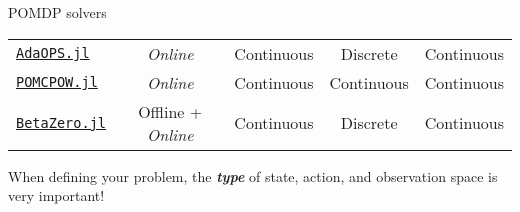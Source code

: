 \begin{frame}{POMDP solvers}
\begin{table}[!t]
{\begin{threeparttable}
\begin{tabular}{lcccc}
        \href{https://github.com/LAMDA-POMDP/AdaOPS.jl}{\texttt{AdaOPS.jl}} & \textit{Online} & Continuous & Discrete & Continuous \\
        \href{https://github.com/JuliaPOMDP/POMCPOW.jl}{\texttt{POMCPOW.jl}} & \textit{Online} & Continuous & Continuous & Continuous \\
        \href{https://github.com/sisl/BetaZero.jl}{\texttt{BetaZero.jl}} & Offline + \textit{Online} & Continuous & Discrete & Continuous \\
        \bottomrule
    \end{tabular}
    \end{threeparttable}
    }
\end{table}

{\footnotesize
\begin{importantblock}
When defining your problem, the \textbf{\textit{type}} of state, action, and observation space is very important!
\end{importantblock}
}
\end{frame}